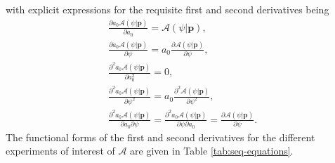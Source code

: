 with explicit expressions for the requisite first and second derivatives being
\begin{subequations}
    \begin{gather}
        \frac{\partial a_0 \mathcal{A} (\psi | \symbf{p})}{\partial a_0} =
            \mathcal{A} (\psi | \symbf{p}),\\
        \frac{\partial a_0 \mathcal{A} (\psi | \symbf{p})}{\partial \psi} =
            a_0 \frac{\partial \mathcal{A} (\psi | \symbf{p})}{\partial \psi},\\
        \frac{\partial^2 a_0 \mathcal{A} (\psi | \symbf{p})}{\partial a_0^2} = 0,\\
        \frac{\partial^2 a_0 \mathcal{A} (\psi | \symbf{p})}{\partial \psi^2} =
            a_0 \frac{\partial^2 \mathcal{A} (\psi | \symbf{p})}{\partial \psi^2},\\
        \frac{\partial^2 a_0 \mathcal{A} (\psi | \symbf{p})}{\partial a_0 \partial \psi} =
            \frac{\partial^2 a_0 \mathcal{A} (\psi | \symbf{p})}{\partial \psi \partial a_0} =
            \frac{\partial \mathcal{A} (\psi | \symbf{p})}{\partial \psi}.
    \end{gather}
\end{subequations}
The functional forms of the first and second derivatives for the different
experiments of interest of $\mathcal{A}$ are given in Table
\ref{tab:seq-equations}.


